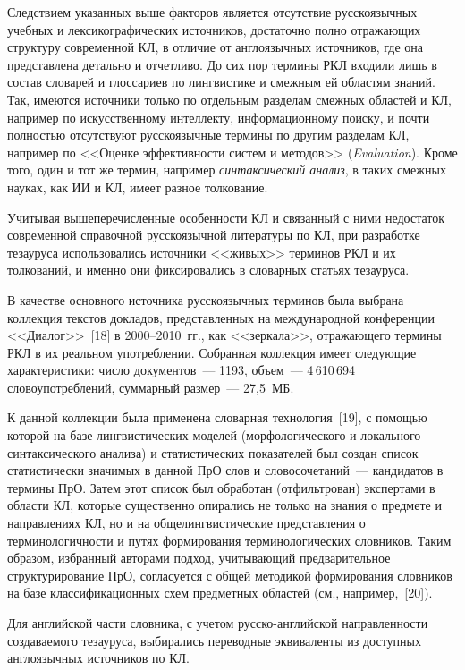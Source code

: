 \begin{multicols}{2}
   Следствием указанных выше факторов является отсутствие русскоязычных учебных и 
лексикографических источников, достаточно полно отражающих структуру современной 
КЛ, в отличие от англоязычных источников, где она представлена детально и отчетливо. До 
сих пор термины РКЛ входили лишь в состав словарей и глоссариев по лингвистике и 
смежным ей областям знаний. Так, имеются источники только по отдельным разделам\linebreak 
смежных областей и КЛ, например по искусственному интеллекту, информационному 
поиску, и\linebreak
 почти полностью отсутствуют русскоязычные термины по другим разделам КЛ, 
например по <<Оценке эффективности систем и методов>> (\textit{Evaluation}). Кроме того, 
один и тот же термин, например \textit{синтаксический анализ}, в таких смежных науках, как 
ИИ и КЛ, имеет разное толкование. 
  
  Учитывая вышеперечисленные особенности КЛ и связанный с ними недостаток 
современной справочной русскоязычной литературы по КЛ, при разработке тезауруса 
использовались источники <<живых>> терминов РКЛ и их толкований, и именно они 
фиксировались в словарных статьях тезауруса. 
  
  В качестве основного источника русскоязычных терминов была выбрана коллекция 
текстов докладов, представленных на международной конференции <<Диалог>>~[18] в 
2000--2010~гг., как <<зеркала>>, отражающего термины РКЛ в их реальном употреблении. 
Собранная коллекция имеет следующие характеристики: число документов~--- 1193, 
объем~--- 4\,610\,694 словоупотреблений, суммарный размер~--- 27,5~МБ.
  
  К данной коллекции была применена словарная технология~[19], с помощью которой на 
базе лингвистических моделей (морфологического и локального синтаксического анализа) и 
статистических показателей был создан список статистически значимых в данной ПрО слов 
и словосочетаний~--- кандидатов в термины ПрО. Затем этот список был обработан 
(отфильтрован) экспертами в области КЛ, которые существенно опирались не только на 
знания о предмете и направлениях КЛ, но и на общелингвистические представления о 
терминологичности и путях формирования терминологических словников. Таким образом, 
избранный авторами подход, учитывающий предварительное структурирование ПрО, 
согласуется с общей методикой формирования словников на базе классификационных схем 
предметных областей (см., например,~[20]).
  
  Для английской части словника, с учетом русско-английской направленности 
создаваемого тезауруса, выбирались переводные эквиваленты из доступных англоязычных 
источников по КЛ.
  

\end{multicols}
